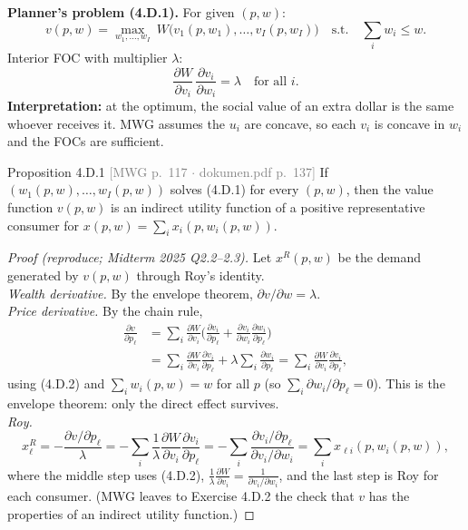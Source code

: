 \documentclass[11pt]{article}
\newcommand{\mwg}[2]{\hfill{\small\textcolor{gray}{[MWG p.~#1 $\cdot$ dokumen.pdf p.~#2]}}}
\begin{document}
\textbf{Planner's problem (4.D.1).} For given $(p,w)$:
\[
v(p,w)=\max_{w_1,\dots,w_I}\ W\big(v_1(p,w_1),\dots,v_I(p,w_I)\big)\quad\text{s.t.}\quad\sum_iw_i\le w .
\]
Interior FOC with multiplier $\lambda$:
\[
\frac{\partial W}{\partial v_i}\,\frac{\partial v_i}{\partial w_i}=\lambda\quad\text{for all }i .\tag{4.D.2}
\]
\textbf{Interpretation:} at the optimum, the social value of an extra dollar is the same whoever receives it.
MWG assumes the $u_i$ are concave, so each $v_i$ is concave in $w_i$ and the FOCs are sufficient.

\begin{prop}{Proposition 4.D.1 \mwg{117}{137}}
If $(w_1(p,w),\dots,w_I(p,w))$ solves (4.D.1) for every $(p,w)$, then the value function $v(p,w)$ is an indirect utility function of a positive representative consumer for $x(p,w)=\sum_ix_i(p,w_i(p,w))$.
\end{prop}
\begin{proof}[Proof (reproduce; Midterm 2025 Q2.2--2.3)]
Let $x^R(p,w)$ be the demand generated by $v(p,w)$ through Roy's identity.\\
\emph{Wealth derivative.} By the envelope theorem, $\partial v/\partial w=\lambda$.\\
\emph{Price derivative.} By the chain rule,
\begin{align*}
\frac{\partial v}{\partial p_\ell}&=\sum_i\frac{\partial W}{\partial v_i}\Big(\frac{\partial v_i}{\partial p_\ell}+\frac{\partial v_i}{\partial w_i}\frac{\partial w_i}{\partial p_\ell}\Big)
\\&=\sum_i\frac{\partial W}{\partial v_i}\frac{\partial v_i}{\partial p_\ell}+\lambda\sum_i\frac{\partial w_i}{\partial p_\ell}
=\sum_i\frac{\partial W}{\partial v_i}\frac{\partial v_i}{\partial p_\ell},
\end{align*}
using (4.D.2) and $\sum_iw_i(p,w)=w$ for all $p$ (so $\sum_i\partial w_i/\partial p_\ell=0$). This is the envelope theorem: only the direct effect survives.\\
\emph{Roy.}
\[x^R_\ell=-\frac{\partial v/\partial p_\ell}{\lambda}=-\sum_i\frac{1}{\lambda}\frac{\partial W}{\partial v_i}\frac{\partial v_i}{\partial p_\ell}
=-\sum_i\frac{\partial v_i/\partial p_\ell}{\partial v_i/\partial w_i}=\sum_ix_{\ell i}(p,w_i(p,w)),\]
where the middle step uses (4.D.2), $\frac{1}{\lambda}\frac{\partial W}{\partial v_i}=\frac{1}{\partial v_i/\partial w_i}$, and the last step is Roy for each consumer.
(MWG leaves to Exercise 4.D.2 the check that $v$ has the properties of an indirect utility function.)
\end{proof}
\end{document}
